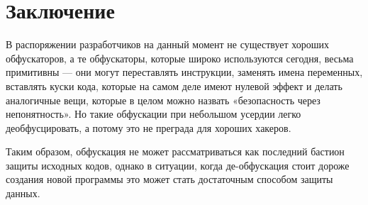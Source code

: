 \newpage
\section*{Заключение}

В распоряжении разработчиков на данный момент не существует хороших обфускаторов, а те обфускаторы, которые широко используются сегодня, весьма примитивны — они могут переставлять инструкции, заменять имена переменных, вставлять куски кода, которые на самом деле имеют нулевой эффект и делать аналогичные вещи, которые в целом можно назвать «безопасность через непонятность». Но такие обфускации при небольшом усердии легко деобфусцировать, а потому это не преграда для хороших хакеров.

Таким образом, обфускация не может рассматриваться как последний бастион защиты исходных кодов, однако в ситуации, когда де-обфускация стоит дороже создания новой программы это может стать достаточным способом защиты данных.